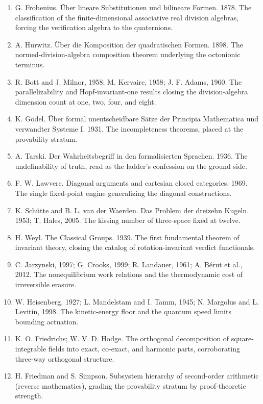 \documentclass[10pt,twocolumn]{article}
\providecommand{\tightlist}{\setlength{\itemsep}{0pt}\setlength{\parskip}{0pt}}
\begin{document}
\begin{enumerate}
\def\labelenumi{\arabic{enumi}.}
\setcounter{enumi}{3}
\tightlist
\item
  G. Frobenius. Über lineare Substitutionen und bilineare Formen. 1878.
  The classification of the finite-dimensional associative real division
  algebras, forcing the verification algebra to the quaternions.
\item
  A. Hurwitz. Über die Komposition der quadratischen Formen. 1898. The
  normed-division-algebra composition theorem underlying the octonionic
  terminus.
\item
  R. Bott and J. Milnor, 1958; M. Kervaire, 1958; J. F. Adams, 1960. The
  parallelizability and Hopf-invariant-one results closing the
  division-algebra dimension count at one, two, four, and eight.
\item
  K. Gödel. Über formal unentscheidbare Sätze der Principia Mathematica
  und verwandter Systeme I. 1931. The incompleteness theorems, placed at
  the provability stratum.
\item
  A. Tarski. Der Wahrheitsbegriff in den formalisierten Sprachen. 1936.
  The undefinability of truth, read as the ladder's confession on the
  ground side.
\item
  F. W. Lawvere. Diagonal arguments and cartesian closed categories.
  1969. The single fixed-point engine generalizing the diagonal
  constructions.
\item
  K. Schütte and B. L. van der Waerden. Das Problem der dreizehn Kugeln.
  1953; T. Hales, 2005. The kissing number of three-space fixed at
  twelve.
\item
  H. Weyl. The Classical Groups. 1939. The first fundamental theorem of
  invariant theory, closing the catalog of rotation-invariant verdict
  functionals.
\item
  C. Jarzynski, 1997; G. Crooks, 1999; R. Landauer, 1961; A. Bérut et
  al., 2012. The nonequilibrium work relations and the thermodynamic
  cost of irreversible erasure.
\item
  W. Heisenberg, 1927; L. Mandelstam and I. Tamm, 1945; N. Margolus and
  L. Levitin, 1998. The kinetic-energy floor and the quantum speed
  limits bounding actuation.
\item
  K. O. Friedrichs; W. V. D. Hodge. The orthogonal decomposition of
  square-integrable fields into exact, co-exact, and harmonic parts,
  corroborating three-way orthogonal structure.
\item
  H. Friedman and S. Simpson. Subsystem hierarchy of second-order
  arithmetic (reverse mathematics), grading the provability stratum by
  proof-theoretic strength.
\end{enumerate}
\end{document}
